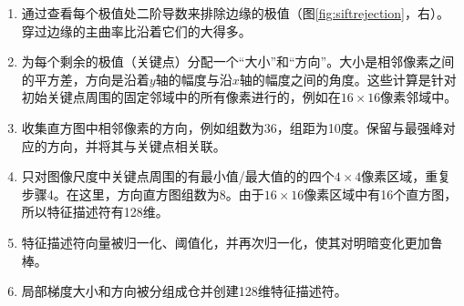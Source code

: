 \begin{enumerate}

\item 通过查看每个极值处二阶导数来排除边缘的极值（图\ref{fig:siftrejection}，右）。穿过边缘的主曲率比沿着它们的大得多。
\item 为每个剩余的极值（关键点）分配一个“大小”和“方向”。大小是相邻像素之间的平方差，方向是沿着$y$轴的幅度与沿$x$轴的幅度之间的角度。这些计算是针对初始关键点周围的固定邻域中的所有像素进行的，例如在$16\times 16$像素邻域中。
\item 收集直方图中相邻像素的方向，例如组数为36，组距为10度。保留与最强峰对应的方向，并将其与关键点相关联。
\item 只对图像尺度中关键点周围的有最小值/最大值的的四个$4\times 4$像素区域，重复步骤4。在这里，方向直方图组数为8。由于$16\times 16$像素区域中有16个直方图，所以特征描述符有128维。
\item 特征描述符向量被归一化、阈值化，并再次归一化，使其对明暗变化更加鲁棒。
\item 局部梯度大小和方向被分组成仓并创建128维特征描述符。

\end{enumerate}

